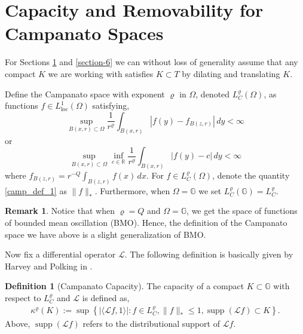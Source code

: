 \documentclass[12pt,a4paper,reqno]{amsart}
\DeclareMathOperator{\supp}{supp}
\renewcommand{\L}{\mathcal{L}}
\renewcommand{\k}{\kappa}
\newcommand{\G}{\mathbb{G}}
\numberwithin{equation}{section}
\theoremstyle{definition}
\newtheorem{defn}[thm]{Definition}
\newtheorem{rem}[thm]{Remark}
\begin{document}
\section{Capacity and Removability for Campanato Spaces}\label{section-4}
For Sections \ref{section-4} and \ref{section-6} we can without loss of generality assume that any compact $K$ we are working with satisfies $K \subset T$ by dilating and translating $K$.

Define the Campanato space with exponent $\varrho$ in $\Omega$, denoted $L_C^{\varrho}(\Omega)$, as functions $f \in L_{\text{loc}}^1(\Omega)$ satisfying, \begin{equation}\label{camp_def_1}
    \sup_{B(x,r) \subset \Omega} \frac{1}{r^{\varrho}} \int_{B(x,r)} \left| f(y) - f_{B(z,r)} \right|\, dy < \infty
\end{equation}
or 
\begin{equation}\label{camp_def_2}
\sup_{B(x,r)\subset \Omega} \inf_{c \in \mathbb{R}} \frac{1}{r^{\varrho}} \int_{B(x,r)} \left| f(y) - c \right|\, dy < \infty
\end{equation}
where $f_{B(z,r)} = r^{-Q} \int_{B(z,r)} f(x)\,dx$. 
For $f \in L_C^{\varrho}(\Omega)$, denote the quantity \ref{camp_def_1} as $\| f\|_*$. Furthermore, when $\Omega = \G$ we set $L_C^{\varrho}(\G) = L_C^{\varrho}.$

\begin{rem}
Notice that when $\varrho = Q$ and $\Omega = \G$, we get the space of functions of bounded mean oscillation (BMO). Hence, the definition of the Campanato space we have above is a slight generalization of BMO. 
\end{rem}

Now fix a differential operator $\L$. The following definition is basically given by Harvey and Polking in \cite[Definition 1.1]{HP2}.
\begin{defn}[Campanato Capacity]\label{camp-cap}
 The capacity of a compact $K \subset \G$ with respect to $L_C^{\varrho}$ and $\L$ is defined as, \begin{align*}
\k^{\varrho}(K) :=  \sup \left\{ |\langle \L f, 1 \rangle |: f \in L_C^{\varrho}, \| f\|_{*} \leq 1, \supp(\L f)\subset K \right\}.    
 \end{align*}  
 Above, $\supp(\L f)$ refers to the distributional support of $\L f$.
\end{defn}
\end{document}
